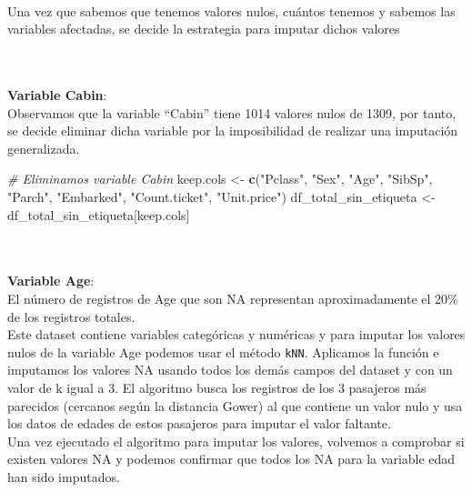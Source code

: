 \documentclass[
]{article}
\newenvironment{Shaded}{\begin{snugshade}}{\end{snugshade}}
\newcommand{\CommentTok}[1]{\textcolor[rgb]{0.56,0.35,0.01}{\textit{#1}}}
\newcommand{\DataTypeTok}[1]{\textcolor[rgb]{0.13,0.29,0.53}{#1}}
\newcommand{\DecValTok}[1]{\textcolor[rgb]{0.00,0.00,0.81}{#1}}
\newcommand{\KeywordTok}[1]{\textcolor[rgb]{0.13,0.29,0.53}{\textbf{#1}}}
\newcommand{\NormalTok}[1]{#1}
\newcommand{\OperatorTok}[1]{\textcolor[rgb]{0.81,0.36,0.00}{\textbf{#1}}}
\newcommand{\StringTok}[1]{\textcolor[rgb]{0.31,0.60,0.02}{#1}}
\begin{document}
\texttt{}\\
Una vez que sabemos que tenemos valores nulos, cuántos tenemos y sabemos
las variables afectadas, se decide la estrategia para imputar dichos
valores

\texttt{}\\
\texttt{}~\\
\textbf{Variable Cabin}: \texttt{}\\
Observamos que la variable ``Cabin'' tiene 1014 valores nulos de 1309,
por tanto, se decide eliminar dicha variable por la imposibilidad de
realizar una imputación generalizada.

\texttt{}

\begin{Shaded}
\begin{Highlighting}[]
\CommentTok{# Eliminamos variable Cabin}
\NormalTok{keep.cols <-}\StringTok{ }\KeywordTok{c}\NormalTok{(}\StringTok{"Pclass"}\NormalTok{, }\StringTok{"Sex"}\NormalTok{, }\StringTok{"Age"}\NormalTok{, }\StringTok{"SibSp"}\NormalTok{, }\StringTok{"Parch"}\NormalTok{, }\StringTok{"Embarked"}\NormalTok{, }\StringTok{"Count.ticket"}\NormalTok{, }\StringTok{"Unit.price"}\NormalTok{)}
\NormalTok{df_total_sin_etiqueta <-}\StringTok{ }\NormalTok{df_total_sin_etiqueta[keep.cols]}
\end{Highlighting}
\end{Shaded}

\texttt{}\\
\texttt{}~\\
\textbf{Variable Age}: \texttt{}\\
El número de registros de Age que son NA representan aproximadamente el
20\% de los registros totales. \texttt{}\\
Este dataset contiene variables categóricas y numéricas y para imputar
los valores nulos de la variable Age podemos usar el método
\texttt{kNN}. Aplicamos la función e imputamos los valores NA usando
todos los demás campos del dataset y con un valor de k igual a 3. El
algoritmo busca los registros de los 3 pasajeros más parecidos (cercanos
según la distancia Gower) al que contiene un valor nulo y usa los datos
de edades de estos pasajeros para imputar el valor faltante. \texttt{}\\
Una vez ejecutado el algoritmo para imputar los valores, volvemos a
comprobar si existen valores NA y podemos confirmar que todos los NA
para la variable edad han sido imputados.

\texttt{}

\begin{Shaded}
\end{Shaded}
\end{document}
